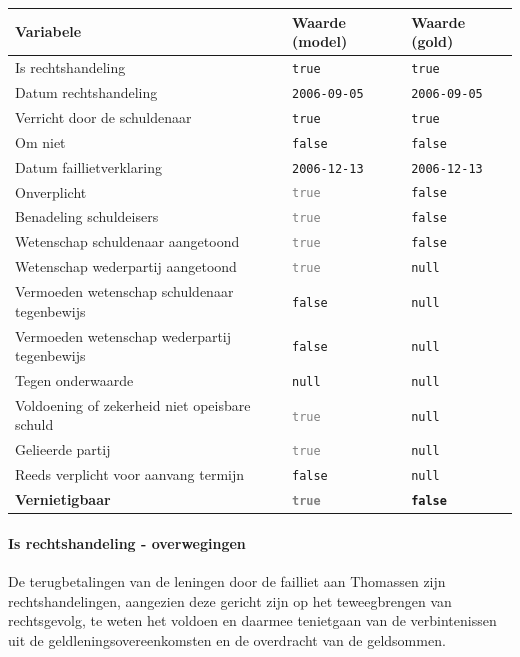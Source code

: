 \documentclass[
  dutch,
  a4paper,
]{article}
\begin{document}
\begin{center}
\small
\begin{tabular}{@{}p{7.4cm}p{2.6cm}p{2.6cm}@{}}
\toprule
Variabele & Waarde (model) & Waarde (gold) \\
\midrule
Is rechtshandeling & \texttt{true} & \texttt{true} \\
Datum rechtshandeling & \texttt{2006-09-05} & \texttt{2006-09-05} \\
Verricht door de schuldenaar & \texttt{true} & \texttt{true} \\
Om niet & \texttt{false} & \texttt{false} \\
Datum faillietverklaring & \texttt{2006-12-13} & \texttt{2006-12-13} \\
Onverplicht & \textcolor{gray}{\texttt{true}} & \texttt{false} \\
Benadeling schuldeisers & \textcolor{gray}{\texttt{true}} & \texttt{false} \\
Wetenschap schuldenaar aangetoond & \textcolor{gray}{\texttt{true}} & \texttt{false} \\
Wetenschap wederpartij aangetoond & \textcolor{gray}{\texttt{true}} & \texttt{null} \\
Vermoeden wetenschap schuldenaar tegenbewijs & \texttt{false} & \texttt{null} \\
Vermoeden wetenschap wederpartij tegenbewijs & \texttt{false} & \texttt{null} \\
Tegen onderwaarde & \texttt{null} & \texttt{null} \\
Voldoening of zekerheid niet opeisbare schuld & \textcolor{gray}{\texttt{true}} & \texttt{null} \\
Gelieerde partij & \textcolor{gray}{\texttt{true}} & \texttt{null} \\
Reeds verplicht voor aanvang termijn & \texttt{false} & \texttt{null} \\
\textbf{Vernietigbaar} & \textbf{\textcolor{gray}{\texttt{true}}} & \textbf{\texttt{false}} \\
\bottomrule
\end{tabular}
\end{center}

\paragraph{Is rechtshandeling - overwegingen}\label{is-rechtshandeling---overwegingen-80}

De terugbetalingen van de leningen door de failliet aan Thomassen zijn rechtshandelingen, aangezien deze gericht zijn op het teweegbrengen van rechtsgevolg, te weten het voldoen en daarmee tenietgaan van de verbintenissen uit de geldleningsovereenkomsten en de overdracht van de geldsommen.
\end{document}

